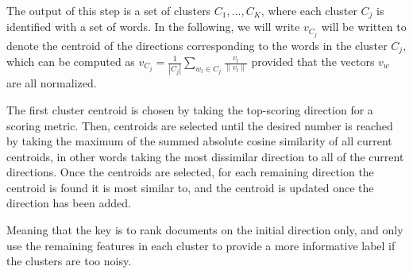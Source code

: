 The output of this step is a set of clusters $C_1,...,C_K$, where each cluster $C_j$ is identified with a set of words.
In the following, we will write   $v_{C_j}$ will be written to denote the centroid of the directions corresponding to the words in the cluster $C_j$, which can be computed as $v_{C_j}= \frac{1}{|C_j|} \sum_{w_l\in C_j} \frac{v_l}{\| v_l \|} $ provided that the vectors $v_w$ are all normalized. 

The first cluster centroid is chosen by taking the top-scoring direction for a scoring metric. Then, centroids are selected until the desired number is reached by taking the maximum of the summed absolute cosine similarity of all current centroids, in other words taking the most dissimilar direction to all of the current directions. Once the centroids are selected, for each remaining direction the centroid is found it is most similar to, and the centroid is updated once the direction has been added. 

Meaning that the key is to rank documents on the initial direction only, and only use the remaining features in each cluster to provide a more informative label if the clusters are too noisy.







